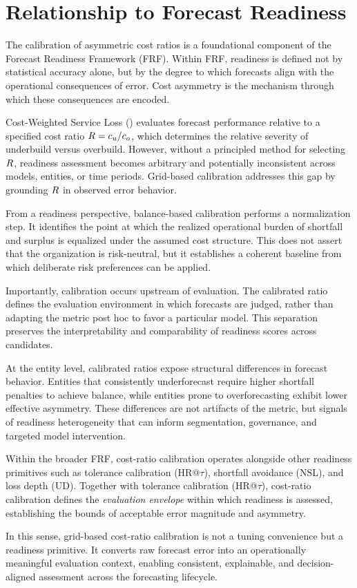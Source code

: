 \section{Relationship to Forecast Readiness}
\label{sec:relationship_to_readiness}

The calibration of asymmetric cost ratios is a foundational component of the
Forecast Readiness Framework (FRF).
Within FRF, readiness is defined not by statistical accuracy alone, but by the
degree to which forecasts align with the operational consequences of error.
Cost asymmetry is the mechanism through which these consequences are encoded.

Cost-Weighted Service Loss (\CWSL{}) evaluates forecast performance relative to a
specified cost ratio $R = c_u/c_o$, which determines the relative severity of
underbuild versus overbuild.
However, without a principled method for selecting $R$, readiness assessment
becomes arbitrary and potentially inconsistent across models, entities, or time
periods.
Grid-based calibration addresses this gap by grounding $R$ in observed error
behavior.

From a readiness perspective, balance-based calibration performs a normalization
step.
It identifies the point at which the realized operational burden of shortfall and
surplus is equalized under the assumed cost structure.
This does not assert that the organization is risk-neutral, but it establishes a
coherent baseline from which deliberate risk preferences can be applied.

Importantly, calibration occurs upstream of evaluation.
The calibrated ratio defines the evaluation environment in which forecasts are
judged, rather than adapting the metric post hoc to favor a particular model.
This separation preserves the interpretability and comparability of readiness
scores across candidates.

At the entity level, calibrated ratios expose structural differences in forecast
behavior.
Entities that consistently underforecast require higher shortfall penalties to
achieve balance, while entities prone to overforecasting exhibit lower effective
asymmetry.
These differences are not artifacts of the metric, but signals of readiness
heterogeneity that can inform segmentation, governance, and targeted model
intervention.

Within the broader FRF, cost-ratio calibration operates alongside other readiness
primitives such as tolerance calibration (HR@$\tau$), shortfall avoidance (NSL),
and loss depth (UD).
Together with tolerance calibration (HR@$\tau$), cost-ratio calibration defines
the \emph{evaluation envelope} within which readiness is assessed, establishing
the bounds of acceptable error magnitude and asymmetry.

In this sense, grid-based cost-ratio calibration is not a tuning convenience but a
readiness primitive.
It converts raw forecast error into an operationally meaningful evaluation
context, enabling consistent, explainable, and decision-aligned assessment across
the forecasting lifecycle.
